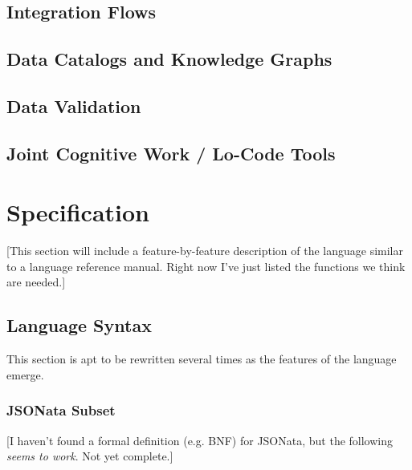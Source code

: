 \documentclass[9pt,letterpaper]{article}
\begin{document}
\subsection{Integration Flows}

\subsection{Data Catalogs and Knowledge Graphs}

\subsection{Data Validation}

\subsection{Joint Cognitive Work / Lo-Code Tools}

\section{Specification}

[This section will include a feature-by-feature description of the language similar to a language reference manual. Right now I've just listed the functions we think are needed.]

\subsection{Language Syntax}
This section is apt to be rewritten several times as the features of the language emerge.

\subsubsection{JSONata Subset}
[I haven't found a formal definition (e.g. BNF) for JSONata, but the following \textit{seems to work}. Not yet complete.]
\end{document}
